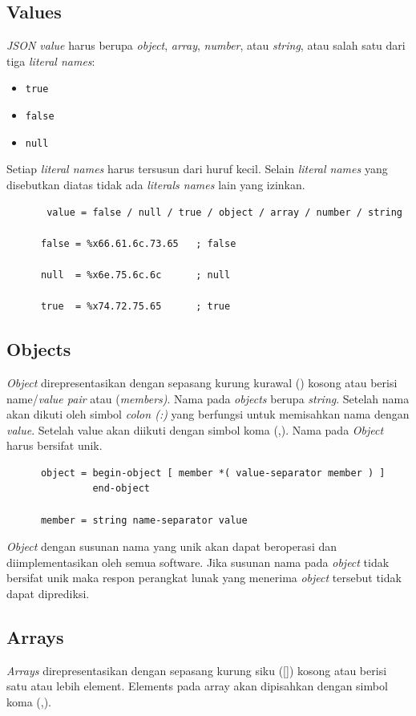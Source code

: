\subsection{Values}
\textit{JSON value} harus berupa \textit{object}, \textit{array}, \textit{number}, atau \textit{string}, atau salah satu dari tiga \textit{literal names}:
\begin{itemize}
	\item  \texttt{true}
	\item \texttt{false}
	\item \texttt{null} 
\end{itemize}
Setiap \textit{literal names} harus tersusun dari huruf kecil. Selain  \textit{literal names} yang disebutkan diatas tidak ada \textit{literals names} lain yang izinkan.

\begin{lstlisting}
       value = false / null / true / object / array / number / string

      false = %x66.61.6c.73.65   ; false

      null  = %x6e.75.6c.6c      ; null

      true  = %x74.72.75.65      ; true
\end{lstlisting}

\subsection{Objects}
\textit{Object} direpresentasikan dengan sepasang kurung kurawal ({}) kosong atau berisi name/\textit{value pair} atau (\textit{members)}. Nama pada \textit{objects} berupa \textit{string}. Setelah nama akan dikuti oleh simbol \textit{colon (:)} yang berfungsi untuk memisahkan nama dengan \textit{value}. Setelah value akan diikuti dengan simbol koma (,). Nama pada \textit{Object} harus bersifat unik.

\begin{lstlisting}
      object = begin-object [ member *( value-separator member ) ]
               end-object

      member = string name-separator value
\end{lstlisting}
\textit{Object} dengan susunan nama yang unik akan dapat beroperasi dan diimplementasikan oleh semua software. Jika susunan nama pada \textit{object} tidak bersifat unik maka respon perangkat lunak yang menerima \textit{object} tersebut tidak dapat diprediksi.

\subsection{Arrays}
\textit{Arrays} direpresentasikan dengan sepasang kurung siku ([]) kosong atau berisi satu atau lebih element. Elements pada array akan dipisahkan dengan simbol koma (,).

